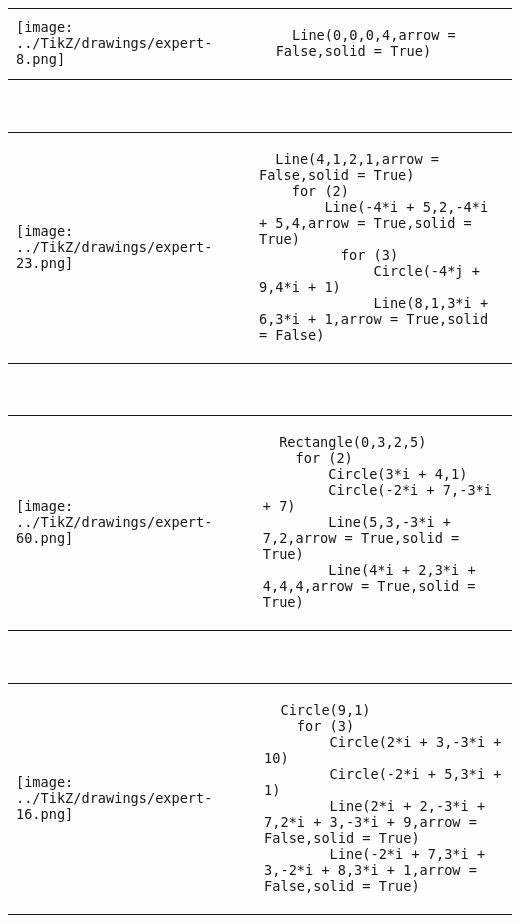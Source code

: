         \begin{tabular}{ll}
\texttt{[image: ../TikZ/drawings/expert-8.png]}&
        \begin{minipage}{10cm}
        \begin{verbatim}
  Line(0,0,0,4,arrow = False,solid = True)
        \end{verbatim}
\end{minipage}
\end{tabular}        
        \\

        \begin{tabular}{ll}
\texttt{[image: ../TikZ/drawings/expert-23.png]}&
        \begin{minipage}{10cm}
        \begin{verbatim}
  Line(4,1,2,1,arrow = False,solid = True)
    for (2)
        Line(-4*i + 5,2,-4*i + 5,4,arrow = True,solid = True)
          for (3)
              Circle(-4*j + 9,4*i + 1)
              Line(8,1,3*i + 6,3*i + 1,arrow = True,solid = False)
        \end{verbatim}
\end{minipage}
\end{tabular}        
        \\

        \begin{tabular}{ll}
\texttt{[image: ../TikZ/drawings/expert-60.png]}&
        \begin{minipage}{10cm}
        \begin{verbatim}
  Rectangle(0,3,2,5)
    for (2)
        Circle(3*i + 4,1)
        Circle(-2*i + 7,-3*i + 7)
        Line(5,3,-3*i + 7,2,arrow = True,solid = True)
        Line(4*i + 2,3*i + 4,4,4,arrow = True,solid = True)
        \end{verbatim}
\end{minipage}
\end{tabular}        
        \\

        \begin{tabular}{ll}
\texttt{[image: ../TikZ/drawings/expert-16.png]}&
        \begin{minipage}{10cm}
        \begin{verbatim}
  Circle(9,1)
    for (3)
        Circle(2*i + 3,-3*i + 10)
        Circle(-2*i + 5,3*i + 1)
        Line(2*i + 2,-3*i + 7,2*i + 3,-3*i + 9,arrow = False,solid = True)
        Line(-2*i + 7,3*i + 3,-2*i + 8,3*i + 1,arrow = False,solid = True)
        \end{verbatim}
\end{minipage}
\end{tabular}        
        \\

